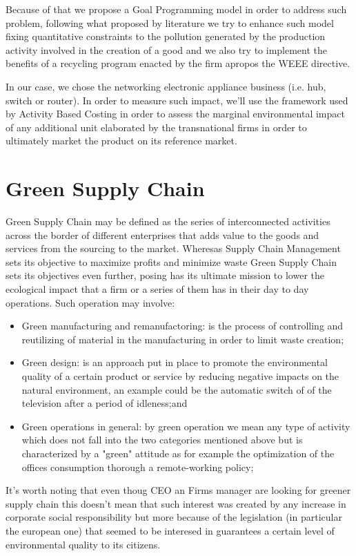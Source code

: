 \documentclass{article}
\begin{document}
Because of that we propose a Goal Programming model in order to address such problem, following what proposed by literature we try to enhance such model fixing quantitative constraints to the pollution generated by the production activity involved in the creation of a good and we also try to implement the benefits of a recycling program enacted by the firm apropos the WEEE directive.

In our case, we chose the networking electronic appliance business (i.e. hub, switch or router). In order to measure such impact, we'll use the framework used by Activity Based Costing in order to assess the marginal environmental impact of any additional unit elaborated by the transnational firms in order to ultimately market the product on its reference market.

\section{Green Supply Chain}
Green Supply Chain may be defined as the series of interconnected activities across the border of different enterprises that adds value to the goods and services from the sourcing to the market. Wheresas Supply Chain Management sets its objective to maximize profits and minimize waste Green Supply Chain sets its objectives even further, posing has its ultimate mission to lower the ecological impact that a firm or a series of them has in their day to day operations. Such operation may involve:
\begin{itemize}
    \item Green manufacturing and remanufactoring: is the process of controlling and reutilizing of material in the manufacturing in order to limit waste creation\cite{urvashi_green_2013};
    \item Green design: is an approach put in place to promote the environmental quality of a certain product or service  by reducing negative impacts on the natural environment, an example could be the automatic switch of of the television after a period of idleness\cite{ceschin_evolution_2016};and
    \item Green operations in general: by green operation we mean any type of activity which does not fall into the two categories mentioned above but is characterized by a "green" attitude as for example the optimization of the offices consumption thorough a remote-working policy;
\end{itemize}

It's worth noting that even thoug CEO an Firms manager are looking for greener supply chain this doesn't mean that such interest was created by any increase in corporate social responsibility but more because of the legislation (in particular the european one) that seemed to be interesed in guarantees a certain level of environmental quality to its citizens.
\end{document}
